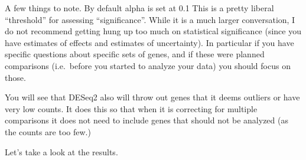 \documentclass[
]{article}
\newenvironment{Shaded}{\begin{snugshade}}{\end{snugshade}}
\newcommand{\DataTypeTok}[1]{\textcolor[rgb]{0.13,0.29,0.53}{#1}}
\newcommand{\DecValTok}[1]{\textcolor[rgb]{0.00,0.00,0.81}{#1}}
\newcommand{\FloatTok}[1]{\textcolor[rgb]{0.00,0.00,0.81}{#1}}
\newcommand{\KeywordTok}[1]{\textcolor[rgb]{0.13,0.29,0.53}{\textbf{#1}}}
\newcommand{\NormalTok}[1]{#1}
\newcommand{\OperatorTok}[1]{\textcolor[rgb]{0.81,0.36,0.00}{\textbf{#1}}}
\newcommand{\StringTok}[1]{\textcolor[rgb]{0.31,0.60,0.02}{#1}}
\begin{document}
\begin{Shaded}
\end{Shaded}

A few things to note. By default alpha is set at 0.1 This is a pretty
liberal ``threshold'' for assessing ``significance''. While it is a much
larger conversation, I do not recommend getting hung up too much on
statistical significance (since you have estimates of effects and
estimates of uncertainty). In particular if you have specific questions
about specific sets of genes, and if these were planned comparisons
(i.e.~before you started to analyze your data) you should focus on
those.

You will see that DESeq2 also will throw out genes that it deems
outliers or have very low counts. It does this so that when it is
correcting for multiple comparisons it does not need to include genes
that should not be analyzed (as the counts are too few.)

Let's take a look at the results.
\end{document}
